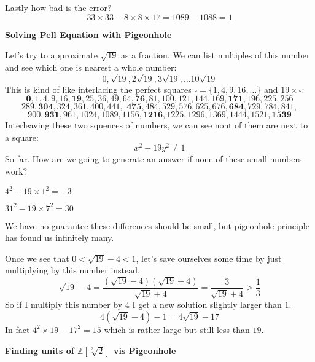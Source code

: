 \documentclass[12pt]{article}
\begin{document}
\noindent Lastly how bad is the error?
$$ 33\times 33 - 8\times 8 \times 17 =
1089 - 1088 = 1 $$
\newpage




\newpage

\noindent \textbf{Solving Pell Equation with Pigeonhole} \newline

\noindent Let's try to approximate $\sqrt{19}$ as a fraction.  We can list multiples of this number and see which one is nearest a whole number:
$$ 0, \sqrt{19}, 
 2\sqrt{19},
  3\sqrt{19},
  \dots
  10 \sqrt{19}
$$ 
This is kind of like interlacing the perfect squares $\square = \{ 1,4,9,16,\dots\}$ and $19 \times \square$:
$$   \textbf{0},    1,    4,    9,   16,   \textbf{19},   25,   36,   49,   64,
         \textbf{76},   81,  100,  121,  144,  169,  \textbf{171},  196,
           225,  256 $$
$$  289,  \textbf{304},  324,  361,  400,  441,  \textbf{ 475},  484,  529,  576,  625,  676,
        \textbf{684},  729,  784,  841, $$
$$900, \textbf{931},  961, 1024, 1089, 1156, \textbf{1216},
       1225, 1296, 1369, 1444, 1521, \textbf{1539} $$
Interleaving these two squences of numbers, we can see nont of them are next to a square:
$$ x^2 - 19y^2 \neq 1 $$
So far.  How are we going to generate an answer if none of these small numbers work?
\newline

\noindent $4^2 - 19 \times 1^2 = -3 $\newline

\noindent $31^2 - 19 \times 7^2 = 30 $ \newline

\noindent We have no guarantee these differences should be small, but pigeonhole-principle has found us infinitely many. \newline

\noindent Once we see that $ 0 < \sqrt{19} - 4 < 1 $, let's save ourselves some time by just multiplying by this number instead.
$$ \sqrt{19} -4 = \frac{(\sqrt{19} -4)(\sqrt{19} +4)}{\sqrt{19} +4} = \frac{3}{\sqrt{19} +4} > \frac{1}{3}$$
So if I multiply this number by $4$ I get a new solution slightly larger than $1$. 
$$ 4(\sqrt{19} - 4)-1 = 4 \sqrt{19} - 17$$
In fact $4^2 \times 19 - 17^2 = 15$ which is rather large but still less than $19$.\newline

\noindent 

\newpage

\noindent \textbf{Finding units of $\mathbb{Z}[\sqrt[3]{2}]$ vis Pigeonhole} \newline
\end{document}
